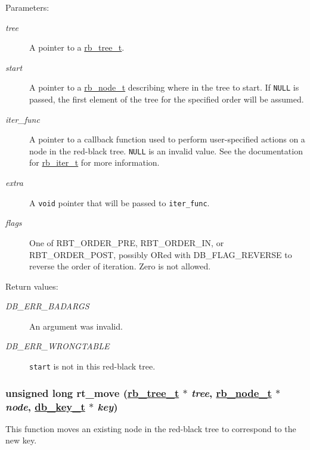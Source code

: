 \begin{Desc}
\item[Parameters:]
\begin{description}
\item[{\em tree}]A pointer to a \hyperlink{group__dbprim__rbtree_a0}{rb\_\-tree\_\-t}. \item[{\em start}]A pointer to a \hyperlink{group__dbprim__rbtree_a1}{rb\_\-node\_\-t} describing where in the tree to start. If {\tt NULL} is passed, the first element of the tree for the specified order will be assumed. \item[{\em iter\_\-func}]A pointer to a callback function used to perform user-specified actions on a node in the red-black tree. {\tt NULL} is an invalid value. See the documentation for \hyperlink{group__dbprim__rbtree_a2}{rb\_\-iter\_\-t} for more information. \item[{\em extra}]A {\tt void} pointer that will be passed to {\tt iter\_\-func}. \item[{\em flags}]One of RBT\_\-ORDER\_\-PRE, RBT\_\-ORDER\_\-IN, or RBT\_\-ORDER\_\-POST, possibly ORed with DB\_\-FLAG\_\-REVERSE to reverse the order of iteration. Zero is not allowed.\end{description}
\end{Desc}
\begin{Desc}
\item[Return values:]
\begin{description}
\item[{\em DB\_\-ERR\_\-BADARGS}]An argument was invalid. \item[{\em DB\_\-ERR\_\-WRONGTABLE}]{\tt start} is not in this red-black tree. \end{description}
\end{Desc}
\hypertarget{group__dbprim__rbtree_a7}{
\subsubsection[rt\_\-move]{\setlength{\rightskip}{0pt plus 5cm}unsigned long rt\_\-move (\hyperlink{dbprim_8h_a0}{rb\_\-tree\_\-t} $\ast$ {\em tree}, \hyperlink{dbprim_8h_a1}{rb\_\-node\_\-t} $\ast$ {\em node}, \hyperlink{dbprim_8h_a0}{db\_\-key\_\-t} $\ast$ {\em key})}}
\label{group__dbprim__rbtree_a7}


This function moves an existing node in the red-black tree to correspond to the new key.


